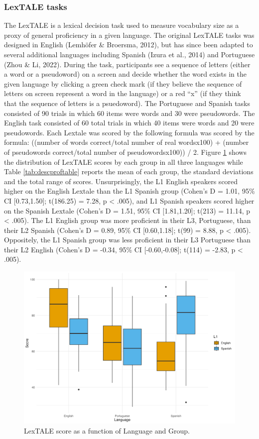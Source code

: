\documentclass[
  man,floatsintext]{apa6}
\begin{document}
\hypertarget{lextale-tasks}{%
\subsubsection{LexTALE tasks}\label{lextale-tasks}}

The LexTALE is a lexical decision task used to measure vocabulary size as a proxy of general proficiency in a given language.
The original LexTALE tasks was designed in English (Lemhöfer \& Broersma, 2012), but has since been adapted to several additional languages including Spanish (Izura et al., 2014) and Portuguese (Zhou \& Li, 2022).
During the task, participants see a sequence of letters (either a word or a pseudoword) on a screen and decide whether the word exists in the given language by clicking a green check mark (if they believe the sequence of letters on screen represent a word in the language) or a red ``x'' (if they think that the sequence of letters is a psuedoword).
The Portuguese and Spanish tasks consisted of 90 trials in which 60 items were words and 30 were pseudowords.
The English task consisted of 60 total trials in which 40 items were words and 20 were pseudowords.
Each Lextale was scored by the following formula was scored by the formula: ((number of words correct/total number of real wordsx100) + (number of pseudowords correct/total number of pseudowordsx100)) / 2.
Figure \ref{fig:prof-desc} shows the distribution of LexTALE scores by each group in all three languages while Table \ref{tab:descproftable} reports the mean of each group, the standard deviations and the total range of scores.
Unsurprisingly, the L1 English speakers scored higher on the English Lextale than the L1 Spanish group (Cohen's D = 1.01, 95\% CI {[}0.73,1.50{]}; t(186.25) = 7.28, p \textless{} .005), and L1 Spanish speakers scored higher on the Spanish Lextale (Cohen's D = 1.51, 95\% CI {[}1.81,1.20{]}; t(213) = 11.14, p \textless{} .005).
The L1 English group was more proficient in their L3, Portuguese, than their L2 Spanish (Cohen's D = 0.89, 95\% CI {[}0.60,1.18{]}; t(99) = 8.88, p \textless{} .005).
Oppositely, the L1 Spanish group was less proficient in their L3 Portuguese than their L2 English (Cohen's D = -0.34, 95\% CI {[}-0.60,-0.08{]}; t(114) = -2.83, p \textless{} .005).

\begin{figure}
\includegraphics[width=425px]{figs/prof_plot} \caption{LexTALE score as a function of Language and Group.}\label{fig:prof-desc}
\end{figure}
\end{document}
